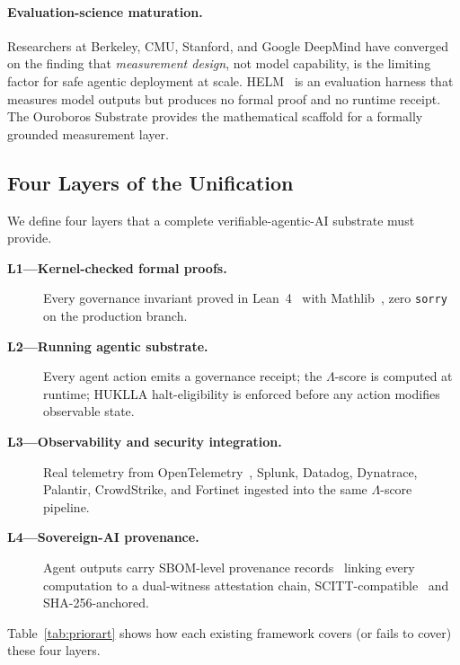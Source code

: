 \documentclass[11pt,letterpaper]{article}
\theoremstyle{definition}
\theoremstyle{remark}
\begin{document}
\paragraph{Evaluation-science maturation.}
Researchers at Berkeley, CMU, Stanford, and Google DeepMind have
converged on the finding that \emph{measurement design}, not model
capability, is the limiting factor for safe agentic deployment at
scale.
HELM~\cite{Liang2022HELM} is an evaluation harness that measures model
outputs but produces no formal proof and no runtime receipt.
The Ouroboros Substrate provides the mathematical scaffold for a
formally grounded measurement layer.

\subsection{Four Layers of the Unification}

We define four layers that a complete verifiable-agentic-AI substrate
must provide.

\begin{description}
  \item[\textbf{L1---Kernel-checked formal proofs.}]
    Every governance invariant proved in Lean~4~\cite{MouraKN2021}
    with Mathlib~\cite{Avigad2024}, zero \texttt{sorry} on the
    production branch.
  \item[\textbf{L2---Running agentic substrate.}]
    Every agent action emits a governance receipt; the
    \(\Lambda\)-score is computed at runtime; HUKLLA
    halt-eligibility is enforced before any action modifies
    observable state.
  \item[\textbf{L3---Observability and security integration.}]
    Real telemetry from OpenTelemetry~\cite{OTel2023}, Splunk,
    Datadog, Dynatrace, Palantir, CrowdStrike, and Fortinet ingested
    into the same \(\Lambda\)-score pipeline.
  \item[\textbf{L4---Sovereign-AI provenance.}]
    Agent outputs carry SBOM-level provenance records~\cite{NTIA2021SBOM}
    linking every computation to a dual-witness attestation chain,
    SCITT-compatible~\cite{IETF2024SCITT} and SHA-256-anchored.
\end{description}

Table~\ref{tab:priorart} shows how each existing framework covers (or
fails to cover) these four layers.
\end{document}
